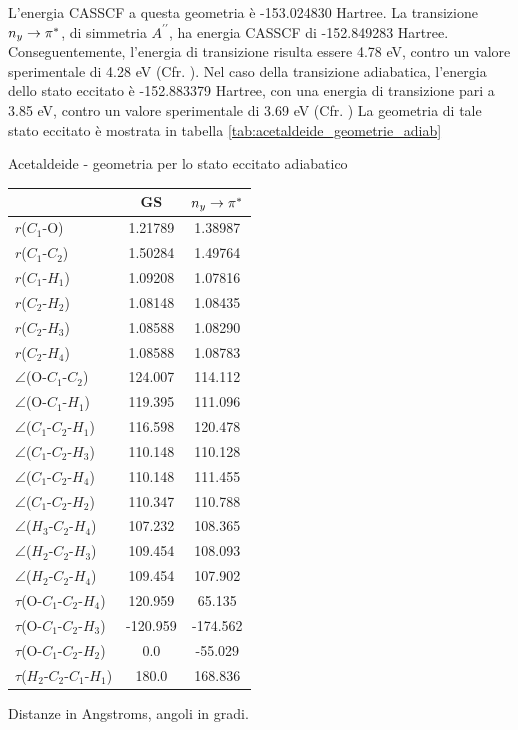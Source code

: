L'energia CASSCF a questa geometria \`e -153.024830 Hartree.
La transizione \mbox{$n_y \rightarrow \pi^{*}$}, di simmetria $A^{\prime\prime}$,
ha energia CASSCF di -152.849283 Hartree. Conseguentemente, l'energia di transizione risulta essere 4.78 eV, contro
un valore sperimentale di 4.28 eV (Cfr. \cite{cpl-241-0-1995-26}).
Nel caso della transizione adiabatica, l'energia dello stato eccitato \`e -152.883379 Hartree, con una energia
di transizione pari a 3.85 eV, contro un valore sperimentale di 3.69 eV (Cfr. \cite{jpc-97-17-1993-4293})
La geometria di tale stato eccitato \`e mostrata in tabella \ref{tab:acetaldeide_geometrie_adiab}

\begin{center}
\begin{threeparttable}
\caption{\small Acetaldeide - geometria per lo stato eccitato adiabatico}
\label{tab:acetaldeide_geometrie_adiab}
\small
\begin{tabular}{|l|c|c|}
\hline
								& GS			&  $n_y \rightarrow \pi^{*}$ \\ 
\hline
$r$($C_1$-O)					& 1.21789		& 1.38987 	\\
$r$($C_1$-$C_2$)				& 1.50284		& 1.49764	\\
$r$($C_1$-$H_1$)				& 1.09208		& 1.07816	\\
$r$($C_2$-$H_2$)				& 1.08148		& 1.08435	\\
$r$($C_2$-$H_3$)				& 1.08588		& 1.08290	\\
$r$($C_2$-$H_4$)				& 1.08588		& 1.08783	\\
$\angle$(O-$C_1$-$C_2$)			& 124.007		& 114.112	\\
$\angle$(O-$C_1$-$H_1$)			& 119.395		& 111.096	\\
$\angle$($C_1$-$C_2$-$H_1$)		& 116.598		& 120.478	\\
$\angle$($C_1$-$C_2$-$H_3$)		& 110.148		& 110.128	\\
$\angle$($C_1$-$C_2$-$H_4$)		& 110.148		& 111.455	\\
$\angle$($C_1$-$C_2$-$H_2$)		& 110.347		& 110.788   \\
$\angle$($H_3$-$C_2$-$H_4$)		& 107.232		& 108.365	\\
$\angle$($H_2$-$C_2$-$H_3$)		& 109.454		& 108.093	\\
$\angle$($H_2$-$C_2$-$H_4$)		& 109.454		& 107.902	\\
$\tau$(O-$C_1$-$C_2$-$H_4$)		& 120.959		&  65.135	\\
$\tau$(O-$C_1$-$C_2$-$H_3$)		& -120.959		& -174.562	\\
$\tau$(O-$C_1$-$C_2$-$H_2$)		& 0.0			& -55.029 	\\
$\tau$($H_2$-$C_2$-$C_1$-$H_1$)	& 180.0			& 168.836 	\\
\hline
\end{tabular}
\begin{tablenotes}
\small
 \item[] Distanze in Angstroms, angoli in gradi.
\end{tablenotes}
\end{threeparttable}
\end{center}
